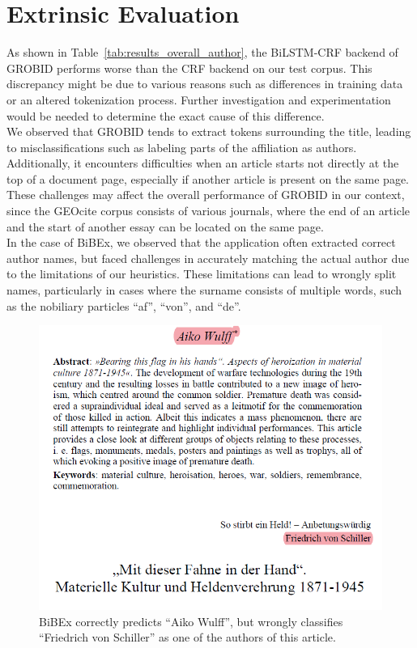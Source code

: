 \section{Extrinsic Evaluation}\label{sec:discussion_extrinsic}
As shown in Table~\ref{tab:results_overall_author}, the BiLSTM-CRF backend of GROBID performs worse than the CRF backend on our test corpus. This discrepancy might be due to various reasons such as differences in training data or an altered tokenization process. Further investigation and experimentation would be needed to determine the exact cause of this difference.\\
We observed that GROBID tends to extract tokens surrounding the title, leading to misclassifications such as labeling parts of the affiliation as authors. Additionally, it encounters difficulties when an article starts not directly at the top of a document page, especially if another article is present on the same page. These challenges may affect the overall performance of GROBID in our context, since the GEOcite corpus consists of various journals, where the end of an article and the start of another essay can be located on the same page.\\
In the case of BiBEx, we observed that the application often extracted correct author names, but faced challenges in accurately matching the actual author due to the limitations of our heuristics. These limitations can lead to wrongly split names, particularly in cases where the surname consists of multiple words, such as the nobiliary particles \enquote{af}, \enquote{von}, and \enquote{de}.\\
\begin{figure}[!ht]
    \centering
    \includegraphics[width=0.6\linewidth]{images/bibex_author_wrong.png}
    \caption{BiBEx correctly predicts \enquote{Aiko Wulff}, but wrongly classifies \enquote{Friedrich von Schiller} as one of the authors of this article.}
    \label{fig:author_error}
\end{figure}
